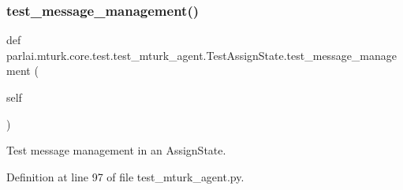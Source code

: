 \subsubsection{\texorpdfstring{test\+\_\+message\+\_\+management()}{test\_message\_management()}}
{\footnotesize\ttfamily def parlai.\+mturk.\+core.\+test.\+test\+\_\+mturk\+\_\+agent.\+Test\+Assign\+State.\+test\+\_\+message\+\_\+management (\begin{DoxyParamCaption}\item[{}]{self }\end{DoxyParamCaption})}

\begin{DoxyVerb}Test message management in an AssignState.
\end{DoxyVerb}
 

Definition at line 97 of file test\+\_\+mturk\+\_\+agent.\+py.


